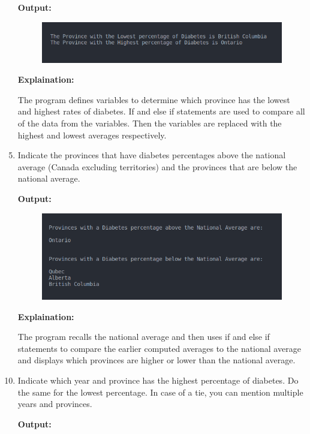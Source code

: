 \begin{enumerate}
	\item[\textbf{Output:}]
	\item[] {\begin{figure}[H]
		\includegraphics[width=12.75cm]{Q2.png}
		\end{figure}}
	\item[\textbf{Explaination:}]
	\item[] {The program defines variables to determine which province has the lowest and highest rates of diabetes. If and else if statements are used to compare all of the data from the variables. Then the variables are replaced with the highest and lowest averages respectively.}
	\item {Indicate the provinces that have diabetes percentages above the national average (Canada excluding territories) and the provinces that are below the national average.}
	\item[\textbf{Output:}]
	\item[] {\begin{figure}[H]
		\includegraphics[width=12.75cm]{Q3.png}
		\end{figure}}
	\item[\textbf{Explaination:}]
	\item[] {The program recalls the national average and then uses if and else if statements to compare the earlier computed averages to the national average and displays which provinces are higher or lower than the national average.}
	\item {Indicate which year and province has the highest percentage of diabetes. Do the same for the lowest percentage. In case of a tie, you can mention multiple years and provinces.}
	\item[\textbf{Output:}]
	\item[] {\begin{figure}[H]

\end{figure}}
\end{enumerate}
